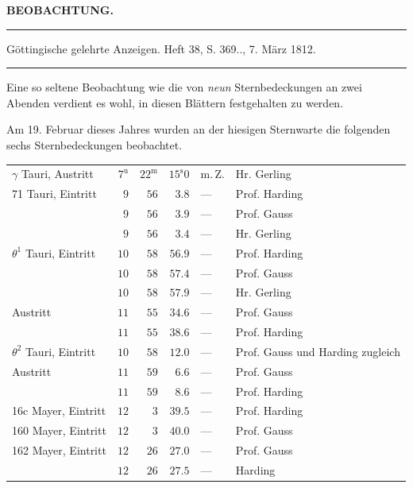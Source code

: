 \clearpage{}\hypertarget{native-353-lower}{}\label{native-353-lower}
\begin{center}\textbf{BEOBACHTUNG.}\par\vspace{4pt}\hrule\vspace{4pt}\fontsize{10}{12}\selectfont Göttingische gelehrte Anzeigen. Heft 38, S. 369\;.., 7. März 1812.\par\vspace{4pt}\hrule\vspace{4pt}\end{center}

\par\indent Eine so seltene Beobachtung wie die von \emph{neun} Sternbedeckungen an zwei Abenden verdient es wohl, in diesen Blättern festgehalten zu werden.

\par\indent Am 19. Februar dieses Jahres wurden an der hiesigen Sternwarte die folgenden sechs Sternbedeckungen beobachtet.

\begin{center}\fontsize{9}{11}\selectfont\setlength{\tabcolsep}{2.5pt}\renewcommand{\arraystretch}{1.15}\begin{tabular}{lrrrll}
$\gamma$ Tauri, Austritt & $7^{\mathrm u}$ & $22^{\mathrm m}$ & $15^{\mathrm s}0$ & m.\,Z. & Hr. Gerling\\
71 Tauri, Eintritt & $9$ & $56$ & $3.8$ & — & Prof. Harding\\
 & $9$ & $56$ & $3.9$ & — & Prof. Gauss\\
 & $9$ & $56$ & $3.4$ & — & Hr. Gerling\\
$\theta^1$ Tauri, Eintritt & $10$ & $58$ & $56.9$ & — & Prof. Harding\\
 & $10$ & $58$ & $57.4$ & — & Prof. Gauss\\
 & $10$ & $58$ & $57.9$ & — & Hr. Gerling\\
Austritt & $11$ & $55$ & $34.6$ & — & Prof. Gauss\\
 & $11$ & $55$ & $38.6$ & — & Prof. Harding\\
$\theta^2$ Tauri, Eintritt & $10$ & $58$ & $12.0$ & — & Prof. Gauss und Harding zugleich\\
Austritt & $11$ & $59$ & $6.6$ & — & Prof. Gauss\\
 & $11$ & $59$ & $8.6$ & — & Prof. Harding\\
16c Mayer, Eintritt & $12$ & $3$ & $39.5$ & — & Prof. Harding\\
160 Mayer, Eintritt & $12$ & $3$ & $40.0$ & — & Prof. Gauss\\
162 Mayer, Eintritt & $12$ & $26$ & $27.0$ & — & Prof. Gauss\\
 & $12$ & $26$ & $27.5$ & — & Harding\\
\end{tabular}\end{center}

